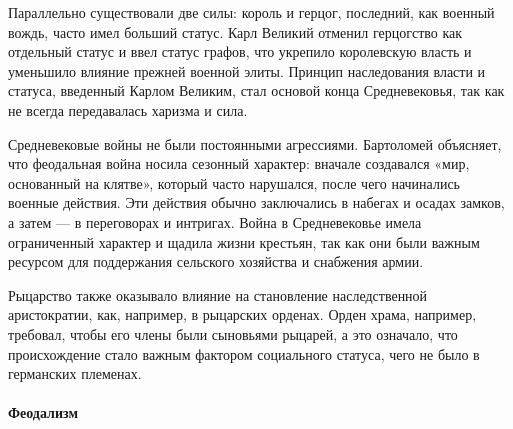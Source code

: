 Параллельно существовали две силы: король и герцог, последний, как военный вождь, часто имел больший статус. Карл Великий отменил герцогство как отдельный статус и ввел статус графов, что укрепило королевскую власть и уменьшило влияние прежней военной элиты. Принцип наследования власти и статуса, введенный Карлом Великим, стал основой конца Средневековья, так как не всегда передавалась харизма и сила.

Средневековые войны не были постоянными агрессиями. Бартоломей объясняет, что феодальная война носила сезонный характер: вначале создавался «мир, основанный на клятве», который часто нарушался, после чего начинались военные действия. Эти действия обычно заключались в набегах и осадах замков, а затем — в переговорах и интригах. Война в Средневековье имела ограниченный характер и щадила жизни крестьян, так как они были важным ресурсом для поддержания сельского хозяйства и снабжения армии.

Рыцарство также оказывало влияние на становление наследственной аристократии, как, например, в рыцарских орденах. Орден храма, например, требовал, чтобы его члены были сыновьями рыцарей, а это означало, что происхождение стало важным фактором социального статуса, чего не было в германских племенах.

\paragraph{Феодализм}


